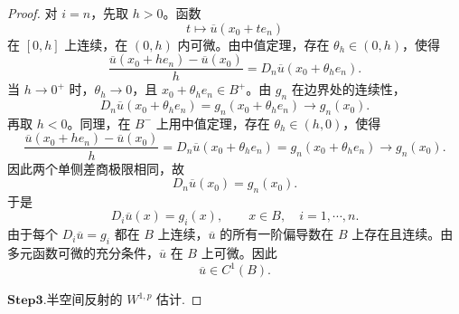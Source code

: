 \documentclass[../../main.tex]{subfiles}%
\begin{document}
\begin{proof}
对 \(i=n\)，先取 \(h>0\)。函数
\[
t\mapsto\overline u(x_0+te_n)
\]
在 \([0,h]\) 上连续，在 \((0,h)\) 内可微。由中值定理，存在 \(\theta_h\in(0,h)\)，使得
\[
\frac{\overline u(x_0+he_n)-\overline u(x_0)}{h}
=D_n\overline u(x_0+\theta_h e_n).
\]
当 \(h\to0^{+}\) 时，\(\theta_h\to0\)，且 \(x_0+\theta_h e_n\in B^{+}\)。由 \(g_n\) 在边界处的连续性，
\[
D_n\overline u(x_0+\theta_h e_n)
=g_n(x_0+\theta_h e_n)
\to g_n(x_0).
\]
再取 \(h<0\)。同理，在 \(B^{-}\) 上用中值定理，存在 \(\theta_h\in(h,0)\)，使得
\[
\frac{\overline u(x_0+he_n)-\overline u(x_0)}{h}
=D_n\overline u(x_0+\theta_h e_n)
=g_n(x_0+\theta_h e_n)
\to g_n(x_0).
\]
因此两个单侧差商极限相同，故
\[
D_n\overline u(x_0)=g_n(x_0).
\]
于是
\[
D_i\overline u(x)=g_i(x),\qquad x\in B,\quad i=1,\cdots,n.
\]
由于每个 \(D_i\overline u=g_i\) 都在 \(B\) 上连续，\(\overline u\) 的所有一阶偏导数在 \(B\) 上存在且连续。由多元函数可微的充分条件，\(\overline u\) 在 \(B\) 上可微。因此
\[
\overline u\in C^{1}(B).
\]

\noindent$\mathbf{Step}\bm{3}$.{\heiti 半空间反射的 \(W^{1,p}\) 估计.}


\end{proof}
\end{document}
